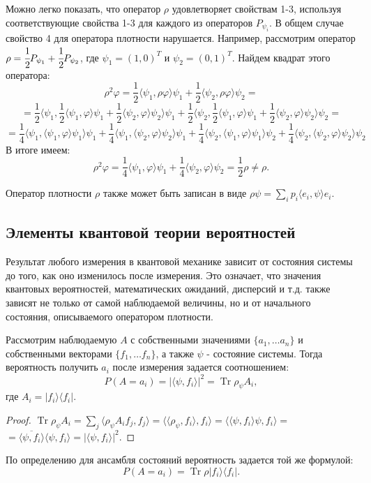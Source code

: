 \documentclass[%
master,         %
subf,           %
href,           %
,times         %
]{disser}
\DeclareMathOperator{\Tr}{Tr}
\numberwithin{equation}{section}
\numberwithin{figure}{section}
\begin{document}
Можно легко показать, что оператор $\rho$ удовлетворяет свойствам 1-3, используя соответствующие свойства 1-3 для каждого из операторов $P_{\psi_i}$. В общем случае свойство 4 для оператора плотности нарушается. Например, рассмотрим оператор $\rho = \cfrac 12P_{\psi_1} + \cfrac 12P_{\psi_2}$, где $\psi_1 = (1, 0)^T$ и $\psi_2 = (0, 1)^T$. Найдем квадрат этого оператора:
\[
\rho^2\varphi = \frac 12\langle\psi_1, \rho\varphi\rangle\psi_1 + \frac 12\langle\psi_2, \rho\varphi\rangle\psi_2 =
\]
\[
= \frac 12\langle\psi_1, \frac 12\langle\psi_1, \varphi\rangle\psi_1 + \frac 12\langle\psi_2, \varphi\rangle\psi_2 \rangle\psi_1 + \frac 12\langle\psi_2, \frac 12\langle\psi_1, \varphi\rangle\psi_1 + \frac 12\langle\psi_2, \varphi\rangle\psi_2 \rangle\psi_2 =
\]
\[
 = 
\frac 14\langle\psi_1, \langle\psi_1,\varphi\rangle\psi_1\rangle\psi_1 + \frac 14\langle\psi_1, \langle\psi_2,\varphi\rangle\psi_2\rangle\psi_1 +
\frac 14\langle\psi_2, \langle\psi_1,\varphi\rangle\psi_1\rangle\psi_2 + \frac 14\langle\psi_2, \langle\psi_2,\varphi\rangle\psi_2\rangle\psi_2
\]
В итоге имеем:
\[
\rho^2\varphi = \frac 14 \langle\psi_1, \varphi\rangle\psi_1 + \frac 14\langle\psi_2, \varphi\rangle\psi_2 = \frac 12\rho \neq \rho.
\]


Оператор плотности $\rho$ также может быть записан в виде $\rho\psi = \sum_i p_i \langle e_i, \psi\rangle e_i$. 

\subsection{Элементы квантовой теории вероятностей}
Результат любого измерения в квантовой механике зависит от состояния системы до того, как оно изменилось после измерения. Это означает, что значения квантовых вероятностей, математических ожиданий, дисперсий и т.д. также зависят не только от самой наблюдаемой величины, но и от начального состояния, описываемого оператором плотности.

Рассмотрим наблюдаемую $A$ с собственными значениями $\{a_1,\ldots a_n\}$ и собственными векторами $\{f_1,\ldots f_n\}$, а также $\psi$ - состояние системы. Тогда вероятность получить $a_i$ после измерения задается соотношением:
\[
P(A = a_i) = |\langle\psi, f_i\rangle|^2 = \Tr \rho_\psi A_i,
\]
где $A_i = |f_i\rangle \langle f_i|$.
\begin{proof}
$\Tr \rho_\psi A_i = \sum_j \langle\rho_\psi A_if_j, f_j\rangle = \langle \langle\rho_\psi, f_i\rangle, f_i\rangle = \langle \langle \psi, f_i\rangle\psi, f_i\rangle = $\\
$= \overline{\langle\psi, f_i\rangle} \langle\psi, f_i\rangle = |\langle\psi, f_i\rangle|^2.$
\end{proof}
По определению для ансамбля состояний вероятность задается той же формулой:
\[
P(A = a_i) = \Tr \rho |f_i\rangle \langle f_i|.
\]
\end{document}
